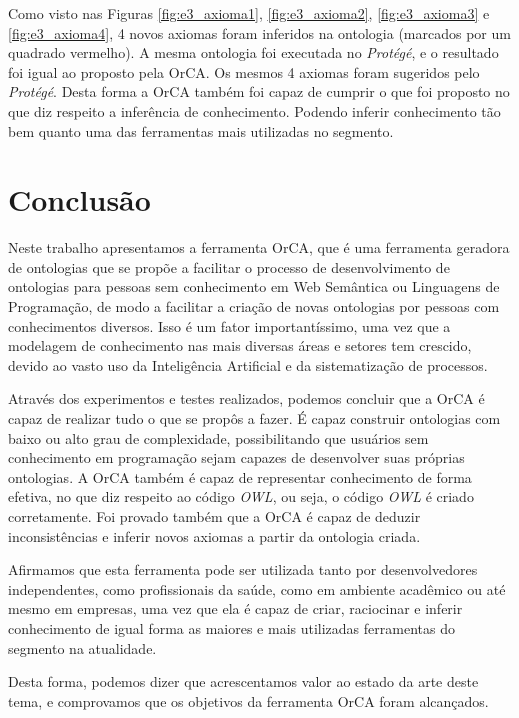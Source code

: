 \documentclass{bcc}
\begin{document}
Como visto nas Figuras \ref{fig:e3_axioma1}, \ref{fig:e3_axioma2}, \ref{fig:e3_axioma3} e \ref{fig:e3_axioma4}, 4 novos axiomas foram inferidos na ontologia (marcados por um quadrado vermelho). A mesma ontologia foi executada no \textit{Protégé}, e o resultado foi igual ao proposto pela OrCA. Os mesmos 4 axiomas foram sugeridos pelo \textit{Protégé}. Desta forma a OrCA também foi capaz de cumprir o que foi proposto no que diz respeito a inferência de conhecimento. Podendo inferir conhecimento tão bem quanto uma das ferramentas mais utilizadas no segmento.

\chapter{Conclusão}
\label{chap:conclusao}

Neste trabalho apresentamos a ferramenta OrCA, que é uma ferramenta geradora de ontologias que se propõe a facilitar o processo de desenvolvimento de ontologias para pessoas sem conhecimento em Web Semântica ou Linguagens de Programação, de modo a facilitar a criação de novas ontologias por pessoas com conhecimentos diversos. Isso é um fator importantíssimo, uma vez que a modelagem de conhecimento nas mais diversas áreas e setores tem crescido, devido ao vasto uso da Inteligência Artificial e da sistematização de processos.

Através dos experimentos e testes realizados, podemos concluir que a OrCA é capaz de realizar tudo o que se propôs a fazer. É capaz construir ontologias com baixo ou alto grau de complexidade, possibilitando que usuários sem conhecimento em programação sejam capazes de desenvolver suas próprias ontologias. A OrCA também é capaz de representar conhecimento de forma efetiva, no que diz respeito ao código \textit{OWL}, ou seja, o código \textit{OWL} é criado corretamente. Foi provado também que a OrCA é capaz de deduzir inconsistências e inferir novos axiomas a partir da ontologia criada.

Afirmamos que esta ferramenta pode ser utilizada tanto por desenvolvedores independentes, como profissionais da saúde, como em ambiente acadêmico ou até mesmo em empresas, uma vez que ela é capaz de criar, raciocinar e inferir conhecimento de igual forma as maiores e mais utilizadas ferramentas do segmento na atualidade.

Desta forma, podemos dizer que acrescentamos valor ao estado da arte deste tema, e comprovamos que os objetivos da ferramenta OrCA foram alcançados. 
\end{document}
